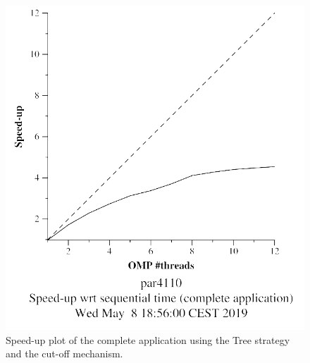 \documentclass[12pt, a4paper]{article}
\begin{document}
\begin{figure}[H]
\centering
\begin{minipage}[b]{0.4\linewidth}
  \centering
  \includegraphics[scale=0.5]{./S2/S2_strong_scalability/multisort-omp-strong_boada-4_tree_cutoff_complete_application}
  \caption{Speed-up plot of the complete application using the Tree strategy and the cut-off mechanism.}
  \label{fig:mandel-omp-10000-strong-21-time}
\end{minipage}%
\hspace{0.5cm}
\begin{minipage}[b]{0.4\linewidth}
  \centering

\end{minipage}
\end{figure}
\end{document}
